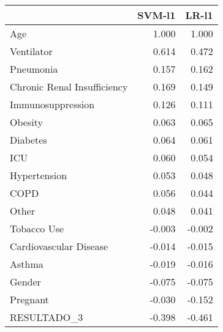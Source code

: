 \begin{tabular}{lrr}
\toprule
{} &  SVM-l1 &  LR-l1 \\
\midrule
Age                         &   1.000 &  1.000 \\
Ventilator                  &   0.614 &  0.472 \\
Pneumonia                   &   0.157 &  0.162 \\
Chronic Renal Insufficiency &   0.169 &  0.149 \\
Immunosuppression           &   0.126 &  0.111 \\
Obesity                     &   0.063 &  0.065 \\
Diabetes                    &   0.064 &  0.061 \\
ICU                         &   0.060 &  0.054 \\
Hypertension                &   0.053 &  0.048 \\
COPD                        &   0.056 &  0.044 \\
Other                       &   0.048 &  0.041 \\
Tobacco Use                 &  -0.003 & -0.002 \\
Cardiovascular Disease      &  -0.014 & -0.015 \\
Asthma                      &  -0.019 & -0.016 \\
Gender                      &  -0.075 & -0.075 \\
Pregnant                    &  -0.030 & -0.152 \\
RESULTADO\_3                 &  -0.398 & -0.461 \\
\bottomrule
\end{tabular}
